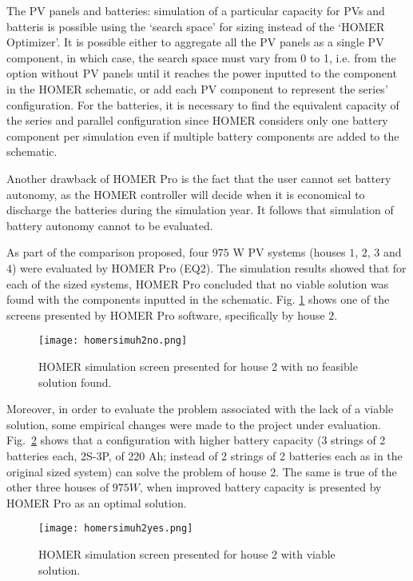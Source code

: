 The PV panels and batteries: simulation of a particular capacity for PVs and batteris is possible using the `search space' for sizing instead of the `HOMER Optimizer'. It is possible either to aggregate all the PV panels as a single PV component, in which case, the search space must vary from 0 to 1, i.e. from the option without PV panels until it reaches the power inputted to the component in the HOMER schematic, or add each PV component to represent the series' configuration. For the batteries, it is necessary to find the equivalent capacity of the series and parallel configuration since HOMER considers only one battery component per simulation even if multiple battery components are added to the schematic.

Another drawback of HOMER Pro is the fact that the user cannot set battery autonomy, as the HOMER controller will decide when it is economical to discharge the batteries during the simulation year. It follows that simulation of battery autonomy cannot to be evaluated.

As part of the comparison proposed, four $975$ W PV systems (houses $1$, $2$, $3$ and $4$) were evaluated by HOMER Pro (EQ2). The simulation results showed that for each of the sized systems, HOMER Pro concluded that no viable solution was found with the components inputted in the schematic. Fig. \ref{fig:homersimuh2no} shows one of the screens presented by HOMER Pro software, specifically by house $2$.

\begin{figure}[h]
\texttt{[image: homersimuh2no.png]}
\centering
\caption{HOMER simulation screen presented for house 2 with no feasible solution found.}
\label{fig:homersimuh2no}
\end{figure}

Moreover, in order to evaluate the problem associated with the lack of a viable solution, some empirical changes were made to the  project under evaluation. Fig.~\ref{fig:homersimuh2yes} shows that a configuration with higher battery capacity (3 strings of 2 batteries each, 2S-3P, of 220 Ah; instead of 2 strings of 2 batteries each as in the original sized system) can solve the problem of house 2. The same is true of the other three houses of $975 W$, when improved battery capacity is presented by HOMER Pro as an optimal solution.

\begin{figure}[h]
\texttt{[image: homersimuh2yes.png]}
\centering
\caption{HOMER simulation screen presented for house 2 with viable solution.}
\label{fig:homersimuh2yes}
\end{figure}

